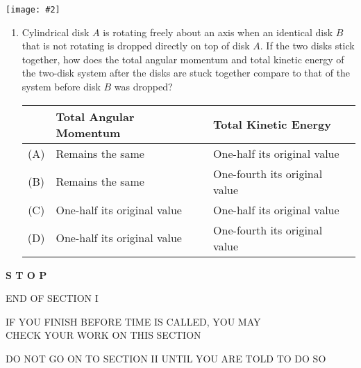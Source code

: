 \documentclass[11pt]{article}
\newcommand{\pic}[2]{\texttt{[image: \#2]}}
\begin{document}
\begin{center}
  \pic{.2}{disks}
  
  \begin{minipage}{.6\textwidth}
    \begin{enumerate}[leftmargin=18pt,start=30]
    \item Cylindrical disk $A$ is rotating freely about an axis when an
      identical disk $B$ that is not rotating is dropped directly on top of disk
      $A$. If the two disks stick together, how does the total angular momentum
      and total kinetic energy of the two-disk system after the disks are stuck
      together compare to that of the system before disk $B$ was dropped?
  
      \begin{tabular}{cll}
        & Total Angular Momentum & Total Kinetic Energy\\
        \hline
        (A) & Remains the same & One-half its original value\\
        (B) & Remains the same & One-fourth its original value\\
        (C) & One-half its original value & One-half its original value\\
        (D) & One-half its original value & One-fourth its original value
      \end{tabular}
    \end{enumerate}
  \end{minipage}
\end{center}
\begin{center}
  \textbf{\LARGE S T O P}
  
  \vspace{.3in}END OF SECTION I

  \vspace{.3in}IF YOU FINISH BEFORE TIME IS CALLED, YOU MAY\\
  CHECK YOUR WORK ON THIS SECTION

  \vspace{.3in}DO NOT GO ON TO SECTION II UNTIL YOU ARE TOLD TO DO SO
\end{center}
\end{document}

